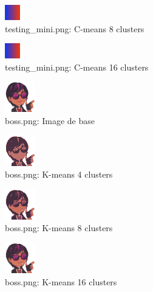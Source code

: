 \documentclass{article}
\begin{document}
  \begin{figure}[h]
    \centering
    \includegraphics[scale=6]{images/result_testing_mini_c_8.png}
    \caption{testing\_mini.png: C-means 8 clusters}
    \label{fig:}
  \end{figure}

  \begin{figure}[h]
    \centering
    \includegraphics[scale=6]{images/result_testing_mini_c_16.png}
    \caption{testing\_mini.png: C-means 16 clusters}
    \label{fig:}
  \end{figure}



  \iffalse
  \begin{figure}
    \includegraphics[scale=2]{images/boss.png}
    \caption{boss.png: Image de base}
    \label{fig:}
  \end{figure}

  \begin{figure}
    \includegraphics[scale=2]{images/result_boss_k_4.png}
    \caption{boss.png: K-means 4 clusters}
    \label{fig:}
  \end{figure}

  \begin{figure}
    \includegraphics[scale=2]{images/result_boss_k_8.png}
    \caption{boss.png: K-means 8 clusters}
    \label{fig:}
  \end{figure}

  \begin{figure}
    \includegraphics[scale=2]{images/result_boss_k_16.png}
    \caption{boss.png: K-means 16 clusters}
    \label{fig:}
  \end{figure}
\end{document}
